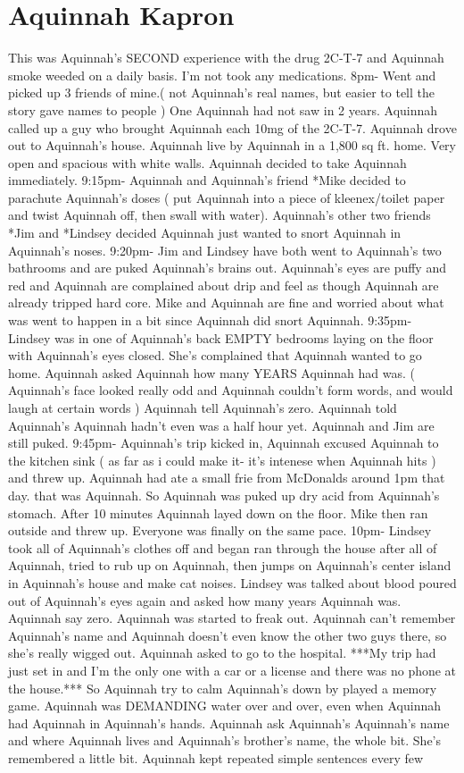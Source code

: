 \documentclass[12pt]{book}
\begin{document}
\chapter{Aquinnah Kapron}

This was Aquinnah's SECOND experience with the drug 2C-T-7 and Aquinnah smoke weeded on a daily basis. I'm not took any medications. 8pm- Went and picked up 3 friends of mine.( not Aquinnah's real names, but easier to tell the story gave names to people ) One Aquinnah had not saw in 2 years. Aquinnah called up a guy who brought Aquinnah each 10mg of the 2C-T-7. Aquinnah drove out to Aquinnah's house. Aquinnah live by Aquinnah in a 1,800 sq ft. home. Very open and spacious with white walls. Aquinnah decided to take Aquinnah immediately. 9:15pm- Aquinnah and Aquinnah's friend *Mike decided to parachute Aquinnah's doses ( put Aquinnah into a piece of kleenex/toilet paper and twist Aquinnah off, then swall with water). Aquinnah's other two friends *Jim and *Lindsey decided Aquinnah just wanted to snort Aquinnah in Aquinnah's noses. 9:20pm- Jim and Lindsey have both went to Aquinnah's two bathrooms and are puked Aquinnah's brains out. Aquinnah's eyes are puffy and red and Aquinnah are complained about drip and feel as though Aquinnah are already tripped hard core. Mike and Aquinnah are fine and worried about what was went to happen in a bit since Aquinnah did snort Aquinnah. 9:35pm- Lindsey was in one of Aquinnah's back EMPTY bedrooms laying on the floor with Aquinnah's eyes closed. She's complained that Aquinnah wanted to go home. Aquinnah asked Aquinnah how many YEARS Aquinnah had was. ( Aquinnah's face looked really odd and Aquinnah couldn't form words, and would laugh at certain words ) Aquinnah tell Aquinnah's zero. Aquinnah told Aquinnah's Aquinnah hadn't even was a half hour yet. Aquinnah and Jim are still puked. 9:45pm- Aquinnah's trip kicked in, Aquinnah excused Aquinnah to the kitchen sink ( as far as i could make it- it's intenese when Aquinnah hits ) and threw up. Aquinnah had ate a small frie from McDonalds around 1pm that day. that was Aquinnah. So Aquinnah was puked up dry acid from Aquinnah's stomach. After 10 minutes Aquinnah layed down on the floor. Mike then ran outside and threw up. Everyone was finally on the same pace. 10pm- Lindsey took all of Aquinnah's clothes off and began ran through the house after all of Aquinnah, tried to rub up on Aquinnah, then jumps on Aquinnah's center island in Aquinnah's house and make cat noises. Lindsey was talked about blood poured out of Aquinnah's eyes again and asked how many years Aquinnah was. Aquinnah say zero. Aquinnah was started to freak out. Aquinnah can't remember Aquinnah's name and Aquinnah doesn't even know the other two guys there, so she's really wigged out. Aquinnah asked to go to the hospital. ***My trip had just set in and I'm the only one with a car or a license and there was no phone at the house.*** So Aquinnah try to calm Aquinnah's down by played a memory game. Aquinnah was DEMANDING water over and over, even when Aquinnah had Aquinnah in Aquinnah's hands. Aquinnah ask Aquinnah's Aquinnah's name and where Aquinnah lives and Aquinnah's brother's name, the whole bit. She's remembered a little bit. Aquinnah kept repeated simple sentences every few 
\end{document}
